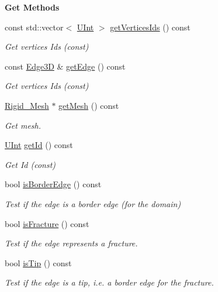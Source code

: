 \begin{Indent}{\bf Get Methods}\par
\begin{DoxyCompactItemize}
\item 
const std\+::vector$<$ \hyperlink{namespaceFVCode3D_a4bf7e328c75d0fd504050d040ebe9eda}{U\+Int} $>$ \hyperlink{classFVCode3D_1_1Rigid__Mesh_1_1Edge_a24050b2332146cdfa44b8833a72bf6a6}{get\+Vertices\+Ids} () const 
\begin{DoxyCompactList}\small\item\em Get vertices Ids (const) \end{DoxyCompactList}\item 
const \hyperlink{classFVCode3D_1_1Rigid__Mesh_a396039ac2943822c4652967ce1849c9f}{Edge3D} \& \hyperlink{classFVCode3D_1_1Rigid__Mesh_1_1Edge_a6445206fd8abc44ad7c64625e4349831}{get\+Edge} () const 
\begin{DoxyCompactList}\small\item\em Get vertices Ids (const) \end{DoxyCompactList}\item 
\hyperlink{classFVCode3D_1_1Rigid__Mesh}{Rigid\+\_\+\+Mesh} $\ast$ \hyperlink{classFVCode3D_1_1Rigid__Mesh_1_1Edge_aea697e13e141eb408f408dabcf23c4aa}{get\+Mesh} () const 
\begin{DoxyCompactList}\small\item\em Get mesh. \end{DoxyCompactList}\item 
\hyperlink{namespaceFVCode3D_a4bf7e328c75d0fd504050d040ebe9eda}{U\+Int} \hyperlink{classFVCode3D_1_1Rigid__Mesh_1_1Edge_ad8afcd874fc84c9debbb96d40ebcb5cf}{get\+Id} () const 
\begin{DoxyCompactList}\small\item\em Get Id (const) \end{DoxyCompactList}\item 
bool \hyperlink{classFVCode3D_1_1Rigid__Mesh_1_1Edge_af31d5110c9b8ee8e4e0b2d34d28aa63c}{is\+Border\+Edge} () const 
\begin{DoxyCompactList}\small\item\em Test if the edge is a border edge (for the domain) \end{DoxyCompactList}\item 
bool \hyperlink{classFVCode3D_1_1Rigid__Mesh_1_1Edge_a337257089bfb042595dd0249be42f917}{is\+Fracture} () const 
\begin{DoxyCompactList}\small\item\em Test if the edge represents a fracture. \end{DoxyCompactList}\item 
bool \hyperlink{classFVCode3D_1_1Rigid__Mesh_1_1Edge_abf23b70a32f904fdd5fe8c525d16ca4f}{is\+Tip} () const 
\begin{DoxyCompactList}\small\item\em Test if the edge is a tip, i.\+e. a border edge for the fracture. \end{DoxyCompactList}\end{DoxyCompactItemize}
\end{Indent}
